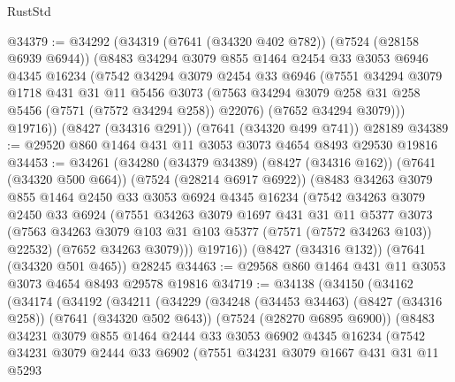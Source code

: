 \begin{lexlean}{RustStd}
\begin{coremodule}
@34379 := @34292
    (@34319
      (@7641 (@34320 @402 @782))
      (@7524 (@28158 @6939 @6944))
      (@8483
        @34294
        @3079
        @855
        @1464
        @2454
        @33
        @3053
        @6946
        @4345
        @16234
        (@7542
          @34294
          @3079
          @2454
          @33
          @6946
          (@7551
            @34294
            @3079
            @1718
            @431
            @31
            @11
            @5456
            @3073
            (@7563 @34294 @3079 @258 @31 @258 @5456 (@7571 (@7572 @34294 @258)) @22076)
            (@7652 @34294 @3079)))
        @19716))
    (@8427 (@34316 @291))
    (@7641 (@34320 @499 @741))
    @28189
@34389 := @29520 @860 @1464 @431 @11 @3053 @3073 @4654 @8493 @29530 @19816
@34453 := @34261
    (@34280
      (@34379 @34389)
      (@8427 (@34316 @162))
      (@7641 (@34320 @500 @664))
      (@7524 (@28214 @6917 @6922))
      (@8483
        @34263
        @3079
        @855
        @1464
        @2450
        @33
        @3053
        @6924
        @4345
        @16234
        (@7542
          @34263
          @3079
          @2450
          @33
          @6924
          (@7551
            @34263
            @3079
            @1697
            @431
            @31
            @11
            @5377
            @3073
            (@7563 @34263 @3079 @103 @31 @103 @5377 (@7571 (@7572 @34263 @103)) @22532)
            (@7652 @34263 @3079)))
        @19716))
    (@8427 (@34316 @132))
    (@7641 (@34320 @501 @465))
    @28245
@34463 := @29568 @860 @1464 @431 @11 @3053 @3073 @4654 @8493 @29578 @19816
@34719 := @34138
    (@34150
      (@34162
        (@34174
          (@34192
            (@34211
              (@34229
                (@34248
                  (@34453 @34463)
                  (@8427 (@34316 @258))
                  (@7641 (@34320 @502 @643))
                  (@7524 (@28270 @6895 @6900))
                  (@8483
                    @34231
                    @3079
                    @855
                    @1464
                    @2444
                    @33
                    @3053
                    @6902
                    @4345
                    @16234
                    (@7542
                      @34231
                      @3079
                      @2444
                      @33
                      @6902
                      (@7551
                        @34231
                        @3079
                        @1667
                        @431
                        @31
                        @11
                        @5293

\end{coremodule}
\end{lexlean}
